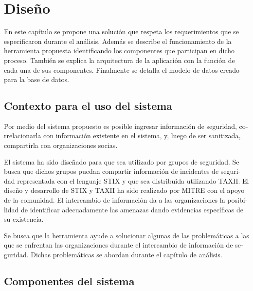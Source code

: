 \makeatother
\setlength\tabcolsep{1mm}
\renewcommand\arraystretch{1.3}
\renewcommand\theFigura{\arabic{FiguraCap4}}
\renewcommand\theTabla{\arabic{TablaCap4}}

\chapter{Diseño}
\label{capitulo4}
	En este capítulo se propone una solución que respeta los requerimientos que se especificaron
		durante el análisis. Además se describe el funcionamiento de la herramienta propuesta identificando los componentes que
		participan en dicho proceso. También se explica la arquitectura de la aplicación con la función de cada una de sus
		componentes. Finalmente se detalla el modelo de datos creado para la base de datos.
	
	\section[Contexto para el uso del sistema\ \ ]{\foreignlanguage{spanish}{Contexto para el uso del sistema\ \ }}
	\foreignlanguage{spanish}{Por medio del sistema propuesto es posible ingresar información de seguridad, correlacionarla
		con información existente en el sistema, y, luego de ser sanitizada, compartirla con organizaciones socias.}
	
	
	\bigskip
	
	\foreignlanguage{spanish}{El sistema ha sido diseñado para que sea utilizado por grupos de seguridad. Se busca que
		dichos grupos puedan compartir información de incidentes de seguridad representada con el lenguaje STIX y que sea
		distribuida utilizando TAXII. El diseño y desarrollo de STIX y TAXII ha sido realizado por MITRE con el apoyo de la
		comunidad. El intercambio de información da a las organizaciones la posibilidad de identificar adecuadamente las
		amenazas dando evidencias específicas de su existencia.}
	
	
	\bigskip
	
	\foreignlanguage{spanish}{Se busca que la herramienta ayude a solucionar algunas de las problemáticas a las que se
		enfrentan las organizaciones durante el intercambio de información de seguridad. Dichas problemáticas se abordan
		durante el capítulo de análisis.}
	
	\section[Componentes del sistema]{\foreignlanguage{spanish}{Componentes del sistema}}
	
